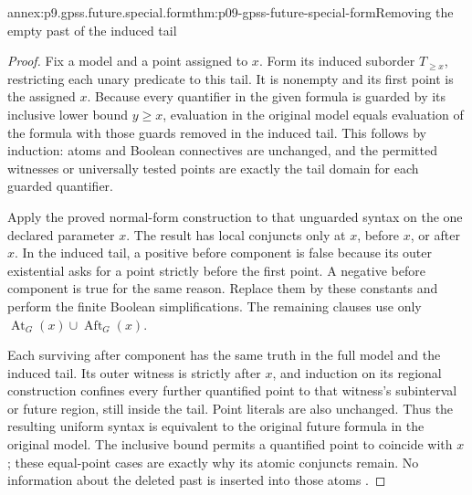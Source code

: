 \begin{annexitem}{annex:p9.gpss.future.special.form}{thm:p09-gpss-future-special-form}{Removing the empty past of the induced tail}
\begin{proof}
Fix a model and a point assigned to \(x\). Form its
induced suborder \(T_{\geq x}\), restricting each unary
predicate to this tail. It is nonempty and its first point
is the assigned \(x\). Because every quantifier in the
given formula is guarded by its inclusive lower bound
\(y\geq x\), evaluation in the original model equals
evaluation of the formula with those guards removed in
the induced tail. This follows by induction: atoms and
Boolean connectives are unchanged, and the permitted
witnesses or universally tested points are exactly the
tail domain for each guarded quantifier.

Apply the proved normal-form construction to that
unguarded syntax on the one declared parameter \(x\).
The result has local conjuncts only at \(x\), before
\(x\), or after \(x\). In the induced tail, a
positive before component is false because its outer
existential asks for a point strictly before the first
point. A negative before component is true for the
same reason. Replace them by these constants and
perform the finite Boolean simplifications. The
remaining clauses use only
\(\operatorname{At}_G(x)\cup\operatorname{Aft}_G(x)\).

Each surviving after component has the same truth in
the full model and the induced tail. Its outer witness
is strictly after \(x\), and induction on its
regional construction confines every further quantified
point to that witness's subinterval or future region,
still inside the tail. Point literals are also unchanged.
Thus the resulting uniform syntax is equivalent to
the original future formula in the original model.
The inclusive bound permits a quantified point to
coincide with \(x\); these equal-point cases are
exactly why its atomic conjuncts remain. No information
about the deleted past is inserted into those atoms
\cite[future formulas and Lemma~1, p.~170]{GabbayPnueliShelahStavi1980}.
\end{proof}
\end{annexitem}

